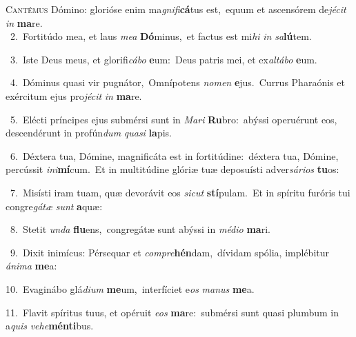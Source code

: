 \lettrine{\initial\textcolor{\initialcolor}{C}}{antémus} Dómino: glorióse enim ma\-\textit{gni}\-\textit{fi}\textbf{cá}tus est,~\star equum et ascensórem de\-\textit{jé}\-\textit{cit} \textit{in} \textbf{ma}\-re.\\
{\numbfont\textcolor{\numbcolor}{~2.}}~Fortitúdo mea, et laus \textit{me}\-\textit{a} \textbf{Dó}\-minus,~\star et factus est mi\textit{hi} \textit{in} \textit{sa}\-\textbf{lú}tem.\par
{\numbfont\textcolor{\numbcolor}{~3.}}~Iste Deus meus, et glorifi\-\textit{cá}\-\textit{bo} \textbf{e}\-um:~\star Deus patris mei, et ex\-\textit{al}\-\textit{tá}\textit{bo} \textbf{e}\-um.\par
{\numbfont\textcolor{\numbcolor}{~4.}}~Dóminus quasi vir pugnátor,~\dagger Omnípotens \textit{no}\-\textit{men} \textbf{e}\-jus.~\star Currus Pharaónis et exércitum ejus pro\-\textit{jé}\-\textit{cit} \textit{in} \textbf{ma}\-re.\par
{\numbfont\textcolor{\numbcolor}{~5.}}~Elécti príncipes ejus submérsi sunt in \textit{Ma}\-\textit{ri} \textbf{Ru}\-bro:~\star abýssi operuérunt eos, descendérunt in profún\textit{dum} \textit{qua}\-\textit{si} \textbf{la}\-pis.\par
{\numbfont\textcolor{\numbcolor}{~6.}}~Déxtera tua, Dómine, magnificáta est in fortitúdine:~\dagger déxtera tua, Dómine, percússit \textit{in}\-\textit{i}\textbf{mí}cum.~\star Et in multitúdine glóriæ tuæ deposuísti adver\-\textit{sá}\-\textit{ri}\textit{os} \textbf{tu}\-os:\par
{\numbfont\textcolor{\numbcolor}{~7.}}~Misísti iram tuam, quæ devorávit eos \textit{sic}\-\textit{ut} \textbf{stí}\-pulam.~\star Et in spíritu furóris tui congre\-\textit{gá}\-\textit{tæ} \textit{sunt} \textbf{a}\-quæ:\par
{\numbfont\textcolor{\numbcolor}{~8.}}~Stetit \textit{un}\-\textit{da} \textbf{flu}\-ens,~\star congregátæ sunt abýssi in \textit{mé}\-\textit{di}\textit{o} \textbf{ma}\-ri.\par
{\numbfont\textcolor{\numbcolor}{~9.}}~Dixit inimícus: Pérsequar et \textit{com}\-\textit{pre}\textbf{hén}dam,~\star dívidam spólia, implébitur \textit{á}\-\textit{ni}\textit{ma} \textbf{me}\-a:\par
{\numbfont\textcolor{\numbcolor}{10.}}~Evaginábo glá\-\textit{di}\-\textit{um} \textbf{me}\-um,~\star interfíciet e\textit{os} \textit{ma}\-\textit{nus} \textbf{me}\-a.\par
{\numbfont\textcolor{\numbcolor}{11.}}~Flavit spíritus tuus, et opéruit \textit{e}\-\textit{os} \textbf{ma}\-re:~\star submérsi sunt quasi plumbum in a\textit{quis} \textit{ve}\-\textit{he}\textbf{mén}\textbf{ti}bus.\par

